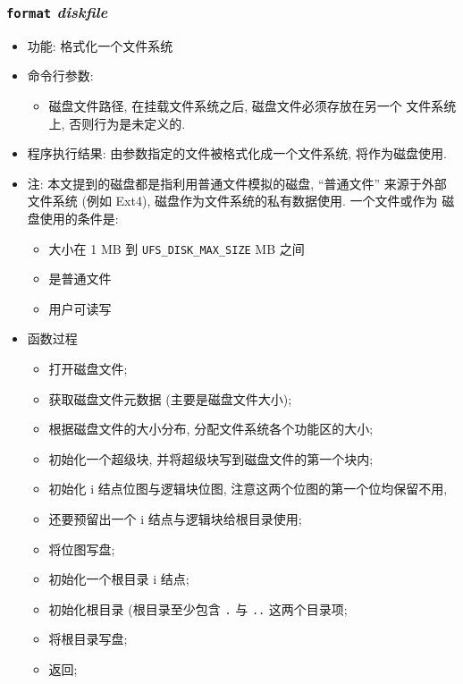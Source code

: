 \documentclass[nofonts, titlepage]{ctexart}
\begin{document}
\subsubsection[\texttt{format}]{\texttt{format} \textit{diskfile}}
\begin{itemize}
\item
  功能: 格式化一个文件系统
\item
  命令行参数:

  \begin{itemize}
  \item
    磁盘文件路径, 在挂载文件系统之后, 磁盘文件必须存放在另一个
    文件系统上, 否则行为是未定义的.
  \end{itemize}
\item
  程序执行结果: 由参数指定的文件被格式化成一个文件系统, 将作为磁盘使用.
\item
  注: 本文提到的磁盘都是指利用普通文件模拟的磁盘, ``普通文件''
  来源于外部 文件系统 (例如 Ext4), 磁盘作为文件系统的私有数据使用.
  一个文件或作为 磁盘使用的条件是:

  \begin{itemize}
  \item
    大小在 1 MB 到 \texttt{UFS\_DISK\_MAX\_SIZE} MB 之间
  \item
    是普通文件
  \item
    用户可读写
  \end{itemize}
\item
  函数过程

  \begin{itemize}
  \item
    打开磁盘文件;
  \item
    获取磁盘文件元数据 (主要是磁盘文件大小);
  \item
    根据磁盘文件的大小分布, 分配文件系统各个功能区的大小;
  \item
    初始化一个超级块, 并将超级块写到磁盘文件的第一个块内;
  \item
    初始化 i 结点位图与逻辑块位图, 注意这两个位图的第一个位均保留不用,
  \item
    还要预留出一个 i 结点与逻辑块给根目录使用;
  \item
    将位图写盘;
  \item
    初始化一个根目录 i 结点;
  \item
    初始化根目录 (根目录至少包含 \texttt{.} 与 \texttt{..} 这两个目录项;
  \item
    将根目录写盘;
  \item
    返回;
  \end{itemize}
\end{itemize}
\end{document}
